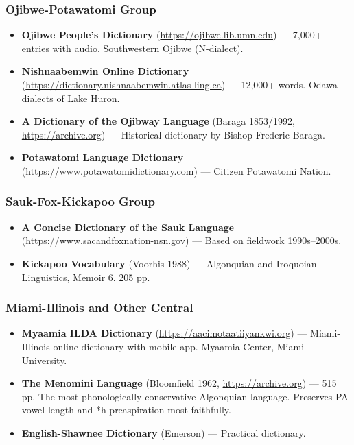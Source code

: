 \subsubsection*{Ojibwe-Potawatomi Group}

\begin{itemize}
  \item \textbf{Ojibwe People's Dictionary}
    (\url{https://ojibwe.lib.umn.edu}) --- 7,000+ entries with audio.
    Southwestern Ojibwe (N-dialect).
  \item \textbf{Nishnaabemwin Online Dictionary}
    (\url{https://dictionary.nishnaabemwin.atlas-ling.ca}) --- 12,000+ words.
    Odawa dialects of Lake Huron.
  \item \textbf{A Dictionary of the Ojibway Language} (Baraga 1853/1992,
    \url{https://archive.org}) --- Historical dictionary by Bishop Frederic
    Baraga.
  \item \textbf{Potawatomi Language Dictionary}
    (\url{https://www.potawatomidictionary.com}) --- Citizen Potawatomi Nation.
\end{itemize}

\subsubsection*{Sauk-Fox-Kickapoo Group}

\begin{itemize}
  \item \textbf{A Concise Dictionary of the Sauk Language}
    (\url{https://www.sacandfoxnation-nsn.gov}) --- Based on fieldwork
    1990s--2000s.
  \item \textbf{Kickapoo Vocabulary} (Voorhis 1988) --- Algonquian and
    Iroquoian Linguistics, Memoir 6. 205 pp.
\end{itemize}

\subsubsection*{Miami-Illinois and Other Central}

\begin{itemize}
  \item \textbf{Myaamia ILDA Dictionary}
    (\url{https://aacimotaatiiyankwi.org}) --- Miami-Illinois online dictionary
    with mobile app. Myaamia Center, Miami University.
  \item \textbf{The Menomini Language} (Bloomfield 1962,
    \url{https://archive.org}) --- 515 pp. The most phonologically conservative
    Algonquian language. Preserves PA vowel length and *h preaspiration most
    faithfully.
  \item \textbf{English-Shawnee Dictionary} (Emerson) --- Practical dictionary.
\end{itemize}

